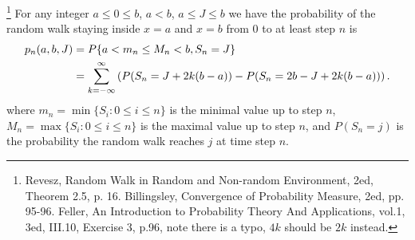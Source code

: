 \begin{theorem}
\footnote{Revesz, Random Walk in Random and Non-random Environment, 2ed,
  Theorem 2.5, p. 16.
  Billingsley, Convergence of Probability Measure, 2ed, pp. 95-96.
  Feller, An Introduction to Probability Theory And Applications, vol.1, 3ed, 
  III.10, Exercise 3, p.96, note there is a typo, $4k$ should be $2k$ instead.}
For any integer $a\le 0\le b$, $a<b$, $a\le J\le b$ we have the probability
of the random walk staying inside $x=a$ and $x=b$ from $0$ to at least
step $n$ is
\begin{align*}
  p_n(a,b,J) 
    &= P\{ a < m_n \le M_n < b, S_n=J \}  \notag \\
    &= \sum_{k=-\infty}^{\infty}
       \left( P(S_n=J+2k(b-a)) - P(S_n=2b-J+2k(b-a)) \right).
\end{align*}
where $m_n = \min \{S_i: 0\le i\le n \}$ is the minimal value up to step $n$,
$M_n = \max \{S_i: 0\le i\le n \}$ is the maximal value up to step $n$, and
$P(S_n=j)$ is the probability the random walk reaches $j$ at time
step $n$.
\end{theorem}
